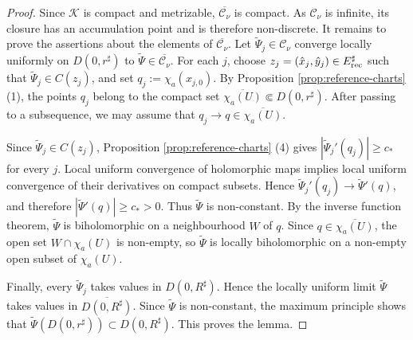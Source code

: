 \documentclass[11pt]{amsart}
\numberwithin{equation}{section}
\theoremstyle{plain}
\theoremstyle{definition}
\theoremstyle{remark}
\begin{document}
\begin{proof}
Since $\mathcal K$ is compact and metrizable,
$\overline{\mathcal C_\nu}$ is compact. As $\mathcal C_\nu$ is
infinite, its closure has an accumulation point and is therefore
non-discrete.
It remains to prove the assertions about the elements of
$\overline{\mathcal C_\nu}$. Let
$\widetilde\Psi_j\in\mathcal C_\nu$ converge locally uniformly on
$D(0,r^\sharp)$ to
$\widetilde\Psi\in\overline{\mathcal C_\nu}$.
For each $j$, choose
$z_j=(\hat x_j,\hat y_j)\in E^\sharp_{\rm rec}$ such that
$\widetilde\Psi_j\in C(z_j)$, and set
$q_j:=\chi_a(x_{j,0})$.
By Proposition \ref{prop:reference-charts} (1), the points $q_j$
belong to the compact set
$\overline{\chi_a(U)}\Subset D(0,r^\sharp)$.
After passing to a subsequence, we may assume that
$q_j\to q\in\overline{\chi_a(U)}$.

Since $\widetilde\Psi_j\in C(z_j)$, Proposition
\ref{prop:reference-charts} (4) gives
$|\widetilde\Psi_j'(q_j)|\geq c_*$ for every $j$.
Local uniform convergence of holomorphic maps implies local uniform
convergence of their derivatives on compact subsets. Hence
$\widetilde\Psi_j'(q_j)\to\widetilde\Psi'(q)$, and therefore
$
|\widetilde\Psi'(q)|\geq c_*>0.
$
Thus $\widetilde\Psi$ is non-constant. By the inverse function
theorem, $\widetilde\Psi$ is biholomorphic on a neighbourhood $W$ of
$q$. Since $q\in\overline{\chi_a(U)}$, the open set
$W\cap\chi_a(U)$ is non-empty, so $\widetilde\Psi$ is locally
biholomorphic on a non-empty open subset of $\chi_a(U)$.

Finally, every $\widetilde\Psi_j$ takes values in
$D(0,R^\sharp)$. Hence the locally uniform limit
$\widetilde\Psi$ takes values in
$\overline{D(0,R^\sharp)}$. Since $\widetilde\Psi$ is non-constant,
the maximum principle shows that
$
\widetilde\Psi(D(0,r^\sharp))\subset D(0,R^\sharp).
$
This proves the lemma.
\end{proof}
\end{document}
